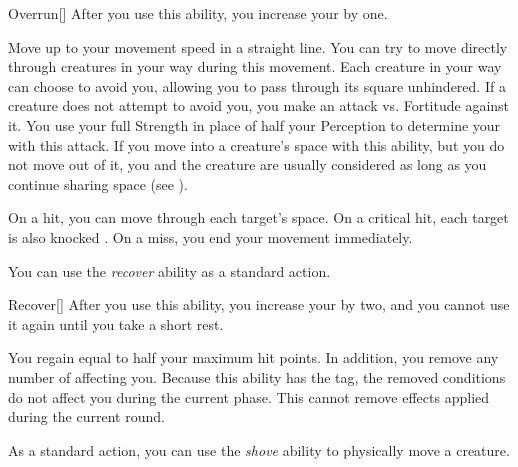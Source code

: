         \begin{activeability}{Overrun}[]
            \rankline
            After you use this ability, you increase your  by one.

            Move up to your movement speed in a straight line.
            You can try to move directly through creatures in your way during this movement.
            Each creature in your way can choose to avoid you, allowing you to pass through its square unhindered.
            If a creature does not attempt to avoid you, you make an attack vs. Fortitude against it.
            You use your full Strength in place of half your Perception to determine your  with this attack.
            If you move into a creature's space with this ability, but you do not move out of it, you and the creature are usually considered \squeezing as long as you continue sharing space (see ).

            On a hit, you can move through each target's space.
            On a critical hit, each target is also knocked \prone.
            On a miss, you end your movement immediately.
        \end{activeability}

        \label{Recover} You can use the \textit{recover} ability as a standard action.
        \begin{activeability}{Recover}[]
            \rankline
            After you use this ability, you increase your  by two, and you cannot use it again until you take a short rest.

            You regain  equal to half your maximum hit points.
            In addition, you remove any number of  affecting you.
            Because this ability has the  tag, the removed conditions do not affect you during the current phase.
            This cannot remove effects applied during the current round.
        \end{activeability}

        \label{Shove} As a standard action, you can use the \textit{shove} ability to physically move a creature.

